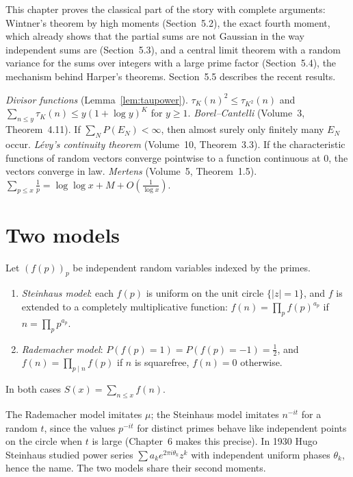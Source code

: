 This chapter proves the classical part of the story with complete arguments: Wintner's theorem by high moments (Section~5.2), the exact fourth moment, which already shows that the partial sums are not Gaussian in the way independent sums are (Section~5.3), and a central limit theorem with a random variance for the sums over integers with a large prime factor (Section~5.4), the mechanism behind Harper's theorems. Section~5.5 describes the recent results.

\begin{reminder}
\emph{Divisor functions} (Lemma~\ref{lem:taupower}). $\tau_K(n)^2\le\tau_{K^2}(n)$ and $\sum_{n\le y}\tau_K(n)\le y(1+\log y)^K$ for $y\ge1$.
\emph{Borel--Cantelli} (Volume~3, Theorem~4.11). If $\sum_NP(E_N)<\infty$, then almost surely only finitely many $E_N$ occur.
\emph{Lévy's continuity theorem} (Volume~10, Theorem~3.3). If the characteristic functions of random vectors converge pointwise to a function continuous at $0$, the vectors converge in law.
\emph{Mertens} (Volume~5, Theorem~1.5). $\sum_{p\le x}\frac1p=\log\log x+M+O(\frac1{\log x})$.
\end{reminder}

\section{Two models}

\begin{definition}\label{def:rmf}
Let $(f(p))_p$ be independent random variables indexed by the primes.
\begin{enumerate}[label=(\alph*)]
\item \emph{Steinhaus model}: each $f(p)$ is uniform on the unit circle $\{|z|=1\}$, and $f$ is extended to a completely multiplicative function: $f(n)=\prod_pf(p)^{a_p}$ if $n=\prod_pp^{a_p}$.
\item \emph{Rademacher model}: $P(f(p)=1)=P(f(p)=-1)=\frac12$, and $f(n)=\prod_{p\mid n}f(p)$ if $n$ is squarefree, $f(n)=0$ otherwise.
\end{enumerate}
In both cases $S(x)=\sum_{n\le x}f(n)$.
\end{definition}

The Rademacher model imitates $\mu$; the Steinhaus model imitates $n^{-it}$ for a random $t$, since the values $p^{-it}$ for distinct primes behave like independent points on the circle when $t$ is large (Chapter~6 makes this precise). In 1930 Hugo Steinhaus studied power series $\sum a_ke^{2\pi i\theta_k}z^k$ with independent uniform phases $\theta_k$, hence the name. The two models share their second moments.


